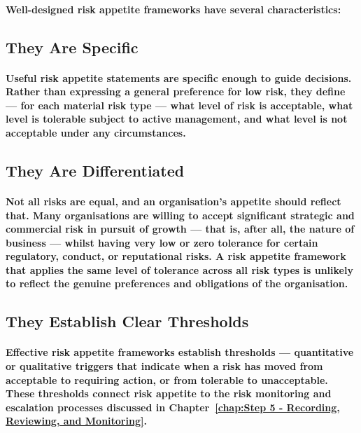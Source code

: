 \paragraph{Well-designed risk appetite frameworks have several characteristics:}

\subsection{They Are Specific}
\paragraph{Useful risk appetite statements are specific enough to guide decisions. Rather than expressing a general preference for low risk, they define — for each material risk type — what level of risk is acceptable, what level is tolerable subject to active management, and what level is not acceptable under any circumstances.}

\subsection{They Are Differentiated}
\paragraph{Not all risks are equal, and an organisation's appetite should reflect that. Many organisations are willing to accept significant strategic and commercial risk in pursuit of growth — that is, after all, the nature of business — whilst having very low or zero tolerance for certain regulatory, conduct, or reputational risks. A risk appetite framework that applies the same level of tolerance across all risk types is unlikely to reflect the genuine preferences and obligations of the organisation.}

\subsection{They Establish Clear Thresholds}
\paragraph{Effective risk appetite frameworks establish \textbf{thresholds} — quantitative or qualitative triggers that indicate when a risk has moved from acceptable to requiring action, or from tolerable to unacceptable. These thresholds connect risk appetite to the risk monitoring and escalation processes discussed in Chapter~\ref{chap:Step 5 - Recording, Reviewing, and Monitoring}.}

